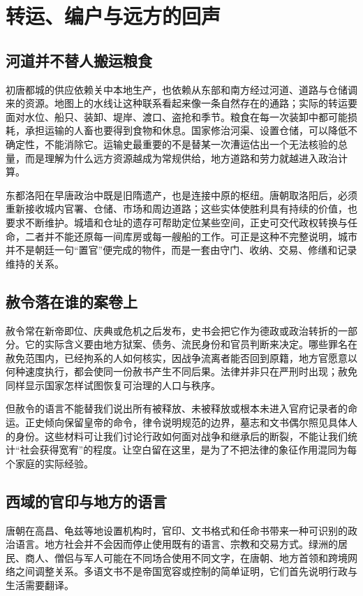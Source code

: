 \section{转运、编户与远方的回声}
\label{sec:early-tang-acceptance-depth-pages-two}

\subsection{河道并不替人搬运粮食}
初唐都城的供应依赖关中本地生产，也依赖从东部和南方经过河道、道路与仓储调来的资源。地图上的水线让这种联系看起来像一条自然存在的通路；实际的转运要面对水位、船只、装卸、堤岸、渡口、盗抢和季节。粮食在每一次装卸中都可能损耗，承担运输的人畜也要得到食物和休息。国家修治河渠、设置仓储，可以降低不确定性，不能消除它。运输史最重要的不是替某一次漕运估出一个无法核验的总量，而是理解为什么远方资源越成为常规供给，地方道路和劳力就越进入政治计算。

东都洛阳在早唐政治中既是旧隋遗产，也是连接中原的枢纽。唐朝取洛阳后，必须重新接收城内官署、仓储、市场和周边道路；这些实体使胜利具有持续的价值，也要求不断维护。城墙和仓址的遗存可帮助定位某些空间，正史可交代政权转换与任命，二者并不能还原每一间库房或每一艘船的工作。可正是这种不完整说明，城市并不是朝廷一句“置官”便完成的物件，而是一套由守门、收纳、交易、修缮和记录维持的关系。

\subsection{赦令落在谁的案卷上}
赦令常在新帝即位、庆典或危机之后发布，史书会把它作为德政或政治转折的一部分。它的实际含义要由地方狱案、债务、流民身份和官员判断来决定。哪些罪名在赦免范围内，已经拘系的人如何核实，因战争流离者能否回到原籍，地方官愿意以何种速度执行，都会使同一份赦书产生不同后果。法律并非只在严刑时出现；赦免同样显示国家怎样试图恢复可治理的人口与秩序。

但赦令的语言不能替我们说出所有被释放、未被释放或根本未进入官府记录者的命运。正史倾向保留皇帝的命令，律令说明规范的边界，墓志和文书偶尔照见具体人的身份。这些材料可让我们讨论行政如何面对战争和继承后的断裂，不能让我们统计“社会获得宽宥”的程度。让空白留在这里，是为了不把法律的象征作用混同为每个家庭的实际经验。

\subsection{西域的官印与地方的语言}
唐朝在高昌、龟兹等地设置机构时，官印、文书格式和任命书带来一种可识别的政治语言。地方社会并不会因而停止使用既有的语言、宗教和交易方式。绿洲的居民、商人、僧侣与军人可能在不同场合使用不同文字，在唐朝、地方首领和跨境网络之间调整关系。多语文书不是帝国宽容或控制的简单证明，它们首先说明行政与生活需要翻译。

